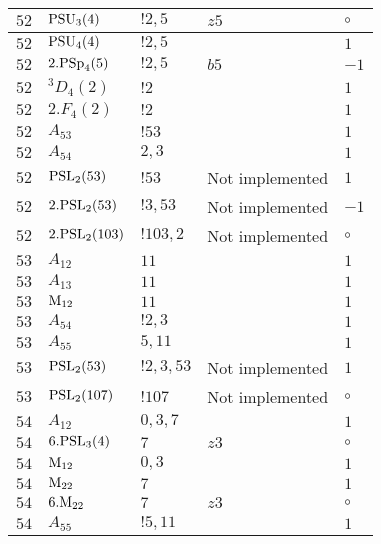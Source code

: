 \documentclass[a4paper, 11pt]{article}
\begin{document}
\begin{longtable}{lllll}
        $ 52 $ & $ {\rm PSU}_{3}(4) $ & $ ! 2,5 $ & $ z5 $ &  $\circ$ \\ \hline
        $ 52 $ & $ {\rm PSU}_{4}(4) $ & $ ! 2,5 $ & $ ~ $ & $ 1$ \\ \hline
        $ 52 $ & $ 2.{\rm PSp}_{4}(5) $ & $ ! 2,5 $ & $ b5 $ & $ -1$ \\ \hline
        $ 52 $ & $ {}^{3}D_{4}(2) $ & $ ! 2 $ & $ ~ $ & $ 1$ \\ \hline
        $ 52 $ & $ 2.F_{4}(2) $ & $ ! 2 $ & $ ~ $ & $ 1$ \\ \hline
        $ 52 $ & $ A_{53} $ & $ !53 $ & $ ~ $ & $ 1$ \\ \hline
        $ 52 $ & $ A_{54} $ & $ 2, 3 $ & $ ~ $ & $ 1$ \\ \hline
        $ 52 $ & $ {\rm PSL}_{2}(53) $ & $ !53 $ &  Not implemented & $ 1$ \\ \hline
        $ 52 $ & $ 2.{\rm PSL}_{2}(53) $ & $ !3, 53 $ &  Not implemented & $ -1$ \\ \hline
        $ 52 $ & $ 2.{\rm PSL}_{2}(103) $ & $ !103, 2 $ &  Not implemented &  $\circ$ \\ \hline
        $ 53 $ & $ A_{12} $ & $ 11 $ & $ ~ $ & $ 1$ \\ \hline
        $ 53 $ & $ A_{13} $ & $ 11 $ & $ ~ $ & $ 1$ \\ \hline
        $ 53 $ & $ {\rm M}_{12} $ & $ 11 $ & $ ~ $ & $ 1$ \\ \hline
        $ 53 $ & $ A_{54} $ & $ !2, 3 $ & $ ~ $ & $ 1$ \\ \hline
        $ 53 $ & $ A_{55} $ & $ 5, 11 $ & $ ~ $ & $ 1$ \\ \hline
        $ 53 $ & $ {\rm PSL}_{2}(53) $ & $ !2, 3, 53 $ &  Not implemented & $ 1$ \\ \hline
        $ 53 $ & $ {\rm PSL}_{2}(107) $ & $ !107 $ &  Not implemented &  $\circ$ \\ \hline
        $ 54 $ & $ A_{12} $ & $ 0,3,7 $ & $ ~ $ & $ 1$ \\ \hline
        $ 54 $ & $ 6.{\rm PSL}_{3}(4) $ & $ 7 $ & $ z3 $ &  $\circ$ \\ \hline
        $ 54 $ & $ {\rm M}_{12} $ & $ 0,3 $ & $ ~ $ & $ 1$ \\ \hline
        $ 54 $ & $ {\rm M}_{22} $ & $ 7 $ & $ ~ $ & $ 1$ \\ \hline
        $ 54 $ & $ 6.{\rm M}_{22} $ & $ 7 $ & $ z3 $ &  $\circ$ \\ \hline
        $ 54 $ & $ A_{55} $ & $ !5, 11 $ & $ ~ $ & $ 1$ \\ \hline

\end{longtable}
\end{document}
